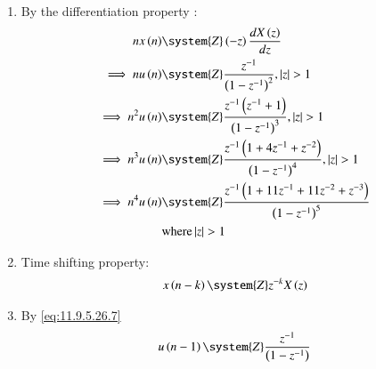 
\begin{enumerate}

    \item 
    By the differentiation property :
    \begin{align}
     n x\brak{n} & \system{Z} \brak{-z} \frac{dX\brak{z}}{dz} \label{eq:11.9.5.26.1}\\
    \implies    n u\brak{n} & \system{Z} \frac{z^{-1}}{\brak{1-z^{-1}}^2} ,   \abs{z} >1 \label{eq:11.9.5.26.2}\\
    \implies     n^2 u\brak{n} & \system{Z} \frac{z^{-1}\brak{z^{-1}+1}}{\brak{1-z^{-1}}^3} ,  \abs{z} > 1\label{eq:11.9.5.26.3}\\
    \implies     n^3 u\brak{n} & \system{Z} \frac{z^{-1}\brak{1+4z^{-1}+z^{-2}}}{\brak{1-z^{-1}}^4} ,   \abs{z} >1\label{eq:11.9.5.26.4} \\
    \implies   n^4 u\brak{n} & \system{Z} \frac{z^{-1}\brak{1+11z^{-1}+11z^{-2}+z^{-3}}}{\brak{1-z^{-1}}^5}\label{eq:11.9.5.26.5}\\ &  \text{where}  \abs{z} >1\notag 
    \end{align}
    
    
    \item 
    Time shifting property:
    \begin{align}
         x\brak{n-k}\system{Z} z^{-k}X\brak{z}\label{eq:11.9.5.26.7}
    \end{align}
    
    \item 
    By \eqref{eq:11.9.5.26.7}
    \begin{align}
       u\brak{n-1}\system{Z} \frac{z^{-1}}{\brak{1-z^{-1}}}
    \end{align}
    

\end{enumerate}
